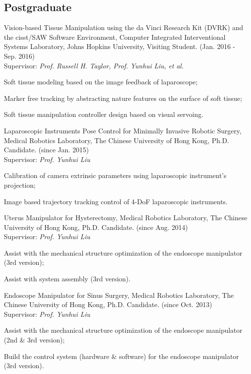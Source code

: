 \documentclass[10pt,letterpaper]{article}
\renewenvironment{itemize}{
  \begin{list}{}{
    \setlength{\leftmargin}{1.5em}
    \setlength{\itemsep}{0.25em}
    \setlength{\parskip}{0pt}
    \setlength{\parsep}{0.25em}
  }
}{
  \end{list}
}
\begin{document}
\subsection*{Postgraduate}
\begin{itemize}
\item Vision-based Tissue Manipulation using the da Vinci Research Kit (DVRK) and the cisst/SAW Software Environment, Computer Integrated Interventional Systems Laboratory, Johns Hopkins University, Visiting Student. (Jan. 2016 - Sep. 2016) \\
  Supervisor: \textit{Prof. Russell H. Taylor, Prof. Yunhui Liu, et al.}
  \begin{itemize}
  \item Soft tissue modeling based on the image feedback of laparoscope;
  \item Marker free tracking by abstracting nature features on the surface of soft tissue;
  \item Soft tissue manipulation controller design based on visual servoing.
  \end{itemize}

\item Laparoscopic Instruments Pose Control for Minimally Invasive Robotic Surgery, Medical Robotics Laboratory, The Chinese University of Hong Kong, Ph.D. Candidate. (since Jan. 2015) \\
  Supervisor: \textit{Prof. Yunhui Liu}
  \begin{itemize}
  \item Calibration of camera extrinsic parameters using laparoscopic instrument's projection;
  \item Image based trajectory tracking control of 4-DoF laparoscopic instruments.
  \end{itemize}

\item Uterus Manipulator for Hysterectomy, Medical Robotics Laboratory, The Chinese University of Hong Kong, Ph.D. Candidate. (since Aug. 2014) \\
  Supervisor: \textit{Prof. Yunhui Liu}
  \begin{itemize}
  \item Assist with the mechanical structure optimization of the endoscope manipulator (3rd version);
  \item Assist with system assembly (3rd version).
  \end{itemize}

\item Endoscope Manipulator for Sinus Surgery, Medical Robotics Laboratory, The Chinese University of Hong Kong, Ph.D. Candidate. (since Oct. 2013) \\
  Supervisor: \textit{Prof. Yunhui Liu}
  \begin{itemize}
  \item Assist with the mechanical structure optimization of the endoscope manipulator (2nd \& 3rd version);
  \item Build the control system (hardware \& software) for the endoscope manipulator (3rd version).
  \end{itemize}


\end{itemize}
\end{document}
